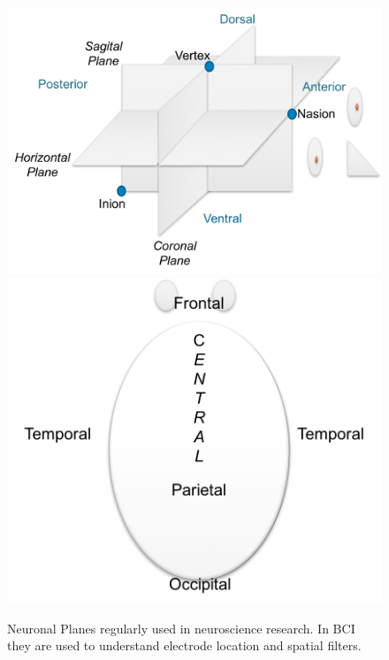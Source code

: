\documentclass[aspectratio=169]{beamer}
\begin{document}
\begin{frame}    
\begin{figure}[htb]
\centering
\includegraphics[scale=0.4]{images/neuralplanes.png}
\includegraphics[scale=0.4]{images/neuroanatomy.png}
\caption[Neuroanatomical structures of the brain]{Neuronal Planes regularly used in neuroscience research.  In BCI they are used to understand electrode location and spatial filters.}
\label{fig:neuroanatomy}
\end{figure}
\end{frame}
\end{document}
